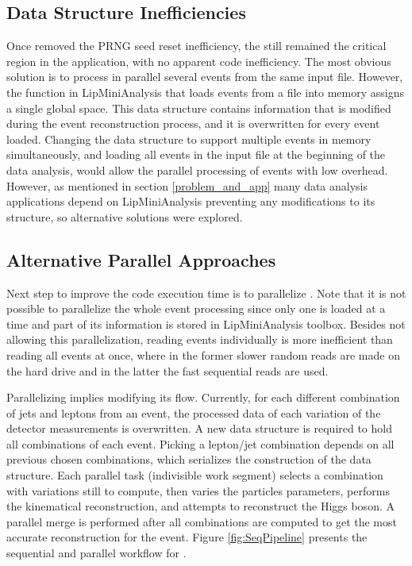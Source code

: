 \subsection{Data Structure Inefficiencies}
\label{data_inef}

Once removed the PRNG seed reset inefficiency, the \ttDilepKinFit still remained the critical region in the application, with no apparent code inefficiency. The most obvious solution is to process in parallel several events from the same input file. However, the function in LipMiniAnalysis that loads events from a file into memory assigns a single global space. This data structure contains information that is modified during the event reconstruction process, and it is overwritten for every event loaded. Changing the data structure to support multiple events in memory simultaneously, and loading all events in the input file at the beginning of the data analysis, would allow the parallel processing of events with low overhead. However, as mentioned in section \ref{problem_and_app} many data analysis applications depend on LipMiniAnalysis preventing any modifications to its structure, so alternative solutions were explored.

\subsection{Alternative Parallel Approaches}

Next step to improve the code execution time is to parallelize \ttDilepKinFit. Note that it is not possible to parallelize the whole event processing since only one is loaded at a time and part of its information is stored in LipMiniAnalysis toolbox. Besides not allowing this parallelization, reading events individually is more inefficient than reading all events at once, where in the former slower random reads are made on the hard drive and in the latter the fast sequential reads are used.

Parallelizing \ttDilepKinFit implies modifying its flow. Currently, for each different combination of jets and leptons from an event, the processed data of each variation of the detector measurements is overwritten. A new data structure is required to hold all combinations of each event. Picking a lepton/jet combination depends on all previous chosen combinations, which serializes the construction of the data structure. Each parallel task (indivisible work segment) selects a combination with variations still to compute, then varies the particles parameters, performs the kinematical reconstruction, and attempts to reconstruct the Higgs boson. A parallel merge is performed after all combinations are computed to get the most accurate reconstruction for the event. Figure \ref{fig:SeqPipeline} presents the sequential and parallel workflow for \ttDilepKinFit.

